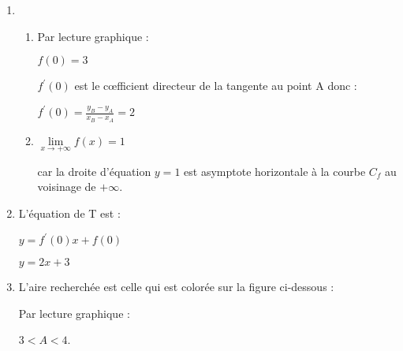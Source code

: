 \begin{corrige}
     \begin{enumerate}
          \item
          \begin{enumerate}[label=\alph*.]
               \item
               Par lecture graphique :
               \par
               $f\left(0\right)=3$
               \par
               $f^{\prime}\left(0\right)$ est le cœfficient directeur de la tangente au point A donc :
               \par
               $f^{\prime}\left(0\right)=\frac{y_{B}-y_{A}}{x_{B}-x_{A}}=2$
               \item
               $\lim\limits_{x\rightarrow +\infty }f\left(x\right)=1$
               \par
               car la droite d'équation $y=1$ est asymptote horizontale à la courbe $C_{f}$ au voisinage de $+\infty $.
 \end{enumerate}

               \item
               L'équation de T est :
               \par
               $y=f^{\prime}\left(0\right)x+f\left(0\right)$
               \par
               $y=2x+3$
               \item
               L'aire recherchée est celle qui est colorée sur la figure ci-dessous :

\begin{center}
\end{center}
               Par lecture graphique :
               \par
               $3 < A < 4$.


\end{enumerate}
\end{corrige}
